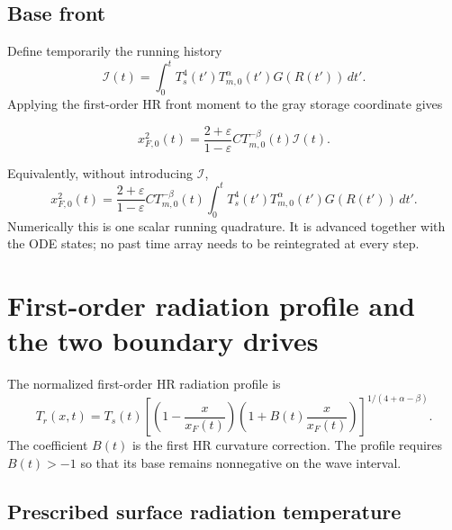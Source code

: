 \documentclass[11pt]{article}
\numberwithin{equation}{section}
\newcommand{\Ts}{T_s}
\newcommand{\Tr}{T_r}
\newcommand{\Tm}{T_{m,0}}
\newcommand{\xf}{x_F}
\newcommand{\xfzero}{x_{F,0}}
\newcommand{\eps}{\varepsilon}
\newcommand{\dif}{\,d}
\newcommand{\calI}{\mathcal{I}}
\begin{document}
\subsection{Base front}

Define temporarily the running history
\begin{equation}
 \calI(t)=\int_0^t
 \Ts^4(t')\Tm^\alpha(t')G(R(t'))\dif t'.
 \label{eq:I_history}
\end{equation}
Applying the first-order HR front moment to the gray storage coordinate gives
\begin{resultbox}
\begin{equation}
 \boxed{
 \xfzero^2(t)
 =\frac{2+\eps}{1-\eps}
 C\Tm^{-\beta}(t)\calI(t).}
 \label{eq:xf0_I}
\end{equation}
\end{resultbox}
Equivalently, without introducing $\calI$,
\begin{equation}
 \boxed{
 \xfzero^2(t)
 =\frac{2+\eps}{1-\eps}
 C\Tm^{-\beta}(t)
 \int_0^t
 \Ts^4(t')\Tm^\alpha(t')G(R(t'))\dif t'.}
 \label{eq:xf0}
\end{equation}
Numerically this is one scalar running quadrature.  It is advanced together
with the ODE states; no past time array needs to be reintegrated at every step.

\section{First-order radiation profile and the two boundary drives}

The normalized first-order HR radiation profile is
\begin{equation}
 \boxed{
 \Tr(x,t)=\Ts(t)
 \left[
 \left(1-\frac{x}{\xf(t)}\right)
 \left(1+B(t)\frac{x}{\xf(t)}\right)
 \right]^{1/(4+\alpha-\beta)}.}
 \label{eq:radiation_profile}
\end{equation}
The coefficient $B(t)$ is the first HR curvature correction.  The profile
requires $B(t)>-1$ so that its base remains nonnegative on the wave interval.

\subsection{Prescribed surface radiation temperature}
\end{document}

